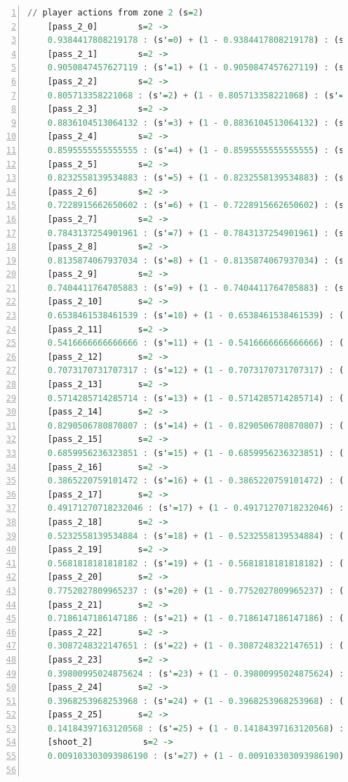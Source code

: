 \documentclass{l4proj}
\begin{document}
\begin{appendices}
\begin{lstlisting}[language=Haskell, numbers=left, caption=MDP used for strategy generation. This is the model specification as-is after the refinements at the end of chapter 3.]
	// player actions from zone 2 (s=2)
	[pass_2_0]	      s=2 ->
	0.9384417808219178 : (s'=0) + (1 - 0.9384417808219178) : (s'=26);
	[pass_2_1]	      s=2 ->
	0.9050847457627119 : (s'=1) + (1 - 0.9050847457627119) : (s'=26);
	[pass_2_2]	      s=2 ->
	0.805713358221068 : (s'=2) + (1 - 0.805713358221068) : (s'=26);
	[pass_2_3]	      s=2 ->
	0.8836104513064132 : (s'=3) + (1 - 0.8836104513064132) : (s'=26);
	[pass_2_4]	      s=2 ->
	0.8595555555555555 : (s'=4) + (1 - 0.8595555555555555) : (s'=26);
	[pass_2_5]	      s=2 ->
	0.8232558139534883 : (s'=5) + (1 - 0.8232558139534883) : (s'=26);
	[pass_2_6]	      s=2 ->
	0.7228915662650602 : (s'=6) + (1 - 0.7228915662650602) : (s'=26);
	[pass_2_7]	      s=2 ->
	0.7843137254901961 : (s'=7) + (1 - 0.7843137254901961) : (s'=26);
	[pass_2_8]	      s=2 ->
	0.8135874067937034 : (s'=8) + (1 - 0.8135874067937034) : (s'=26);
	[pass_2_9]	      s=2 ->
	0.7404411764705883 : (s'=9) + (1 - 0.7404411764705883) : (s'=26);
	[pass_2_10]	      s=2 ->
	0.6538461538461539 : (s'=10) + (1 - 0.6538461538461539) : (s'=26);
	[pass_2_11]	      s=2 ->
	0.5416666666666666 : (s'=11) + (1 - 0.5416666666666666) : (s'=26);
	[pass_2_12]	      s=2 ->
	0.7073170731707317 : (s'=12) + (1 - 0.7073170731707317) : (s'=26);
	[pass_2_13]	      s=2 ->
	0.5714285714285714 : (s'=13) + (1 - 0.5714285714285714) : (s'=26);
	[pass_2_14]	      s=2 ->
	0.8290506780870807 : (s'=14) + (1 - 0.8290506780870807) : (s'=26);
	[pass_2_15]	      s=2 ->
	0.6859956236323851 : (s'=15) + (1 - 0.6859956236323851) : (s'=26);
	[pass_2_16]	      s=2 ->
	0.3865220759101472 : (s'=16) + (1 - 0.3865220759101472) : (s'=26);
	[pass_2_17]	      s=2 ->
	0.49171270718232046 : (s'=17) + (1 - 0.49171270718232046) : (s'=26);
	[pass_2_18]	      s=2 ->
	0.5232558139534884 : (s'=18) + (1 - 0.5232558139534884) : (s'=26);
	[pass_2_19]	      s=2 ->
	0.5681818181818182 : (s'=19) + (1 - 0.5681818181818182) : (s'=26);
	[pass_2_20]	      s=2 ->
	0.7752027809965237 : (s'=20) + (1 - 0.7752027809965237) : (s'=26);
	[pass_2_21]	      s=2 ->
	0.7186147186147186 : (s'=21) + (1 - 0.7186147186147186) : (s'=26);
	[pass_2_22]	      s=2 ->
	0.3087248322147651 : (s'=22) + (1 - 0.3087248322147651) : (s'=26);
	[pass_2_23]	      s=2 ->
	0.39800995024875624 : (s'=23) + (1 - 0.39800995024875624) : (s'=26);
	[pass_2_24]	      s=2 ->
	0.3968253968253968 : (s'=24) + (1 - 0.3968253968253968) : (s'=26);
	[pass_2_25]	      s=2 ->
	0.14184397163120568 : (s'=25) + (1 - 0.14184397163120568) : (s'=26);
	[shoot_2]	       s=2 ->
	0.009103303093986190 : (s'=27) + (1 - 0.009103303093986190) : (s'=26);


\end{lstlisting}
\end{appendices}
\end{document}
